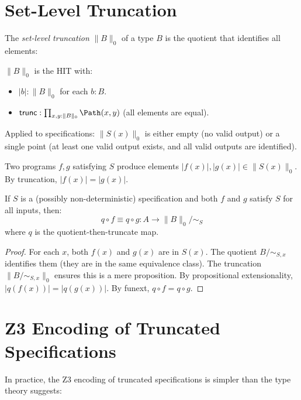 \section{Set-Level Truncation}

The \emph{set-level truncation} $\|B\|_0$ of a type $B$ is the
quotient that identifies all elements:

\begin{definition}
$\|B\|_0$ is the HIT with:
\begin{itemize}
  \item $|b| : \|B\|_0$ for each $b : B$.
  \item $\mathsf{trunc} : \prod_{x, y : \|B\|_0} \Path(x, y)$
    (all elements are equal).
\end{itemize}
\end{definition}

Applied to specifications: $\|S(x)\|_0$ is either empty (no valid
output) or a single point (at least one valid output exists, and
all valid outputs are identified).

Two programs $f, g$ satisfying $S$ produce elements $|f(x)|, |g(x)|
\in \|S(x)\|_0$.  By truncation, $|f(x)| = |g(x)|$.

\begin{theorem}
If $S$ is a (possibly non-deterministic) specification and both $f$
and $g$ satisfy $S$ for all inputs, then:
\[
  q \circ f \equiv q \circ g : A \to \|B\|_0 / {\sim_S}
\]
where $q$ is the quotient-then-truncate map.
\end{theorem}

\begin{proof}
For each $x$, both $f(x)$ and $g(x)$ are in $S(x)$.  The quotient
$B / {\sim_{S,x}}$ identifies them (they are in the same equivalence
class).  The truncation $\|B / {\sim_{S,x}}\|_0$ ensures this is a
mere proposition.  By propositional extensionality,
$|q(f(x))| = |q(g(x))|$.  By funext, $q \circ f = q \circ g$.
\end{proof}

\section{Z3 Encoding of Truncated Specifications}

In practice, the Z3 encoding of truncated specifications is simpler
than the type theory suggests:

